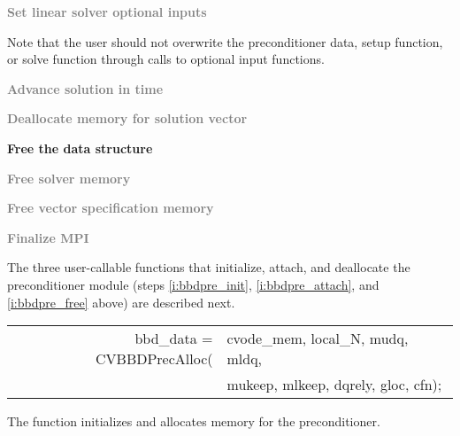\begin{Steps}
\item
  \textcolor{gray}{\bf Set linear solver optional inputs}

  Note that the user should not overwrite the preconditioner data, setup function, 
  or solve function through calls to {\cvspgmr} optional input functions.

\item
  \textcolor{gray}{\bf Advance solution in time}

\item
  \textcolor{gray}{\bf Deallocate memory for solution vector}

\item \label{i:bbdpre_free}
  {\bf Free the {\cvbbdpre} data structure}


\item
  \textcolor{gray}{\bf Free solver memory}
  
\item
  \textcolor{gray}{\bf Free vector specification memory}

\item 
  \textcolor{gray}{\bf Finalize MPI}

\end{Steps}
The three user-callable functions that initialize, attach, and deallocate
the {\cvbbdpre} preconditioner module (steps \ref{i:bbdpre_init},
\ref{i:bbdpre_attach}, and \ref{i:bbdpre_free} above) are described
next.
{
   \begin{tabular}[t]{@{}r@{}l@{}}
     bbd\_data = CVBBDPrecAlloc(&cvode\_mem, local\_N, mudq, mldq, \\
                                &mukeep, mlkeep, dqrely, gloc, cfn);
   \end{tabular}
}
{
  The function  initializes and allocates
  memory for the {\cvbbdpre} preconditioner.
}
